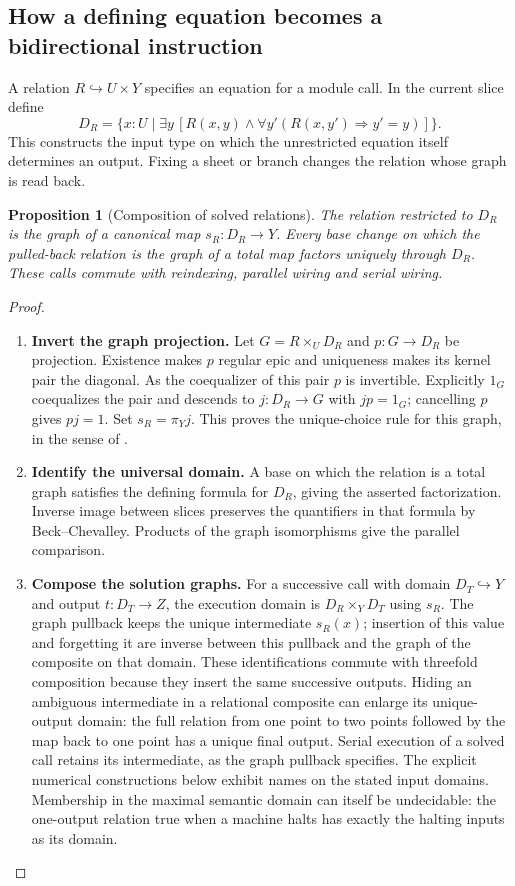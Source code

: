 \documentclass[11pt,a4paper]{article}
\newtheorem{proposition}[proposition]{Proposition}
\theoremstyle{definition}
\theoremstyle{remark}\newaliascnt{remark}{theorem}
\numberwithin{equation}{section}
\begin{document}
\subsection{How a defining equation becomes a bidirectional instruction}
A relation $R\hookrightarrow U\times Y$ specifies an equation for a module call. In the current slice define
\[
 D_R=\{x:U\mid\exists y\,[R(x,y)\wedge\forall y'(R(x,y')\Rightarrow y'=y)]\}.
\]
This constructs the input type on which the unrestricted equation itself determines an output. Fixing a sheet or branch changes the relation whose graph is read back.
\begin{proposition}[Composition of solved relations]\label{thm:solved-composition}
The relation restricted to $D_R$ is the graph of a canonical map $s_R:D_R\to Y$. Every base change on which the pulled-back relation is the graph of a total map factors uniquely through $D_R$. These calls commute with reindexing, parallel wiring and serial wiring.
\end{proposition}
\begin{proof}\leavevmode
\begin{enumerate}[titledsteps]
    \item \textbf{Invert the graph projection.} Let $G=R\times_U D_R$ and $p:G\to D_R$ be projection. Existence makes $p$ regular epic and uniqueness makes its kernel pair the diagonal. As the coequalizer of this pair $p$ is invertible. Explicitly $1_G$ coequalizes the pair and descends to $j:D_R\to G$ with $jp=1_G$; cancelling $p$ gives $pj=1$. Set $s_R=\pi_Yj$. This proves the unique-choice rule for this graph, in the sense of \cite{streicher-logic}. 
    \item \textbf{Identify the universal domain.} A base on which the relation is a total graph satisfies the defining formula for $D_R$, giving the asserted factorization. Inverse image between slices preserves the quantifiers in that formula by Beck--Chevalley. Products of the graph isomorphisms give the parallel comparison. 
    \item \textbf{Compose the solution graphs.} For a successive call with domain $D_T\hookrightarrow Y$ and output $t:D_T\to Z$, the execution domain is $D_R\times_YD_T$ using $s_R$. The graph pullback keeps the unique intermediate $s_R(x)$; insertion of this value and forgetting it are inverse between this pullback and the graph of the composite on that domain. These identifications commute with threefold composition because they insert the same successive outputs. Hiding an ambiguous intermediate in a relational composite can enlarge its unique-output domain: the full relation from one point to two points followed by the map back to one point has a unique final output. Serial execution of a solved call retains its intermediate, as the graph pullback specifies. The explicit numerical constructions below exhibit names on the stated input domains. Membership in the maximal semantic domain can itself be undecidable: the one-output relation true when a machine halts has exactly the halting inputs as its domain.\qedhere
\end{enumerate}
\end{proof}
\end{document}
